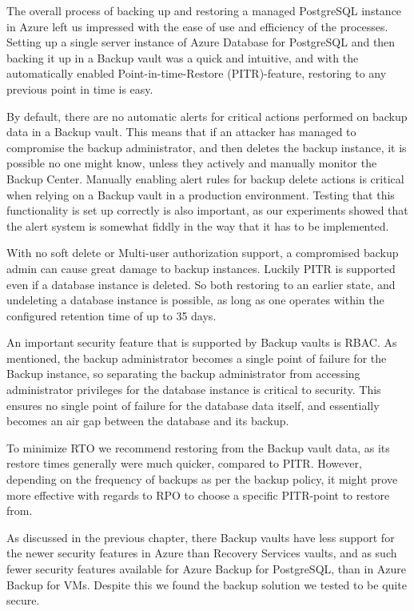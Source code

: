 The overall process of backing up and restoring a managed PostgreSQL instance in Azure left us impressed with the ease of use and efficiency of the processes. Setting up a single server instance of Azure Database for PostgreSQL and then backing it up in a Backup vault was a quick and intuitive, and with the automatically enabled Point-in-time-Restore (PITR)-feature, restoring to any previous point in time is easy. 

By default, there are no automatic alerts for critical actions performed on backup data in a Backup vault. This means that if an attacker has managed to compromise the backup administrator, and then deletes the backup instance, it is possible no one might know, unless they actively and manually monitor the Backup Center. Manually enabling alert rules for backup delete actions is critical when relying on a Backup vault in a production environment. Testing that this functionality is set up correctly is also important, as our experiments showed that the alert system is somewhat fiddly in the way that it has to be implemented.

With no soft delete or Multi-user authorization support, a compromised backup admin can cause great damage to backup instances. Luckily PITR is supported even if a database instance is deleted. So both restoring to an earlier state, and undeleting a database instance is possible, as long as one operates within the configured retention time of up to 35 days.

An important security feature that is supported by Backup vaults is RBAC. As mentioned, the backup administrator becomes a single point of failure for the Backup instance, so separating the backup administrator from accessing administrator privileges for the database instance is critical to security. This ensures no single point of failure for the database data itself, and essentially becomes an air gap between the database and its backup. 

To minimize RTO we recommend restoring from the Backup vault data, as its restore times generally were much quicker, compared to PITR. However, depending on the frequency of backups as per the backup policy, it might prove more effective with regards to RPO to choose a specific PITR-point to restore from. 

As discussed in the previous chapter, there Backup vaults have less support for the newer security features in Azure than Recovery Services vaults, and as such fewer security features available for Azure Backup for PostgreSQL, than in Azure Backup for VMs. Despite this we found the backup solution we tested to be quite secure. 


